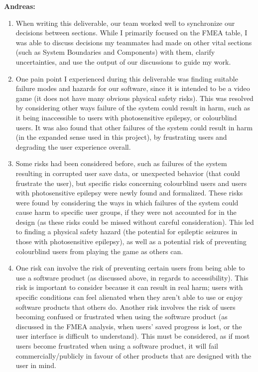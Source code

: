 \documentclass{article}
\begin{document}
\textbf{Andreas:}

\begin{enumerate}
	\item When writing this deliverable, our team worked well to synchronize 
	our decisions between sections. While I primarily focused on the FMEA 
	table, I was able to discuss decisions my teammates had made on other vital 
	sections (such as System Boundaries and Components) with them, clarify 
	uncertainties, and use the output of our discussions to guide my work.
	\item One pain point I experienced during this deliverable was finding 
	suitable failure modes and hazards for our software, since it is intended 
	to be a video game (it does not have many obvious physical safety risks). 
	This was resolved by considering other ways failure of the system could 
	result in harm, such as it being inaccessible to users with photosensitive 
	epilepsy, or colourblind users. It was also found that other failures of 
	the system could result in harm (in the expanded sense used in this 
	project), by frustrating users and degrading the user experience overall.
	\item Some risks had been considered before, such as failures of the system 
	resulting in corrupted user save data, or unexpected behavior (that could 
	frustrate the user), but specific risks concerning colourblind users and 
	users with photosensitive epilepsy were newly found and formalized. These 
	risks were found by considering the ways in which failures of the system 
	could cause harm to specific user groups, if they were not accounted for in 
	the design (as these risks could be missed without careful consideration). 
	This led to finding a physical safety hazard (the potential for epileptic 
	seizures in those with photosensitive epilepsy), as well as a potential 
	risk of preventing colourblind users from playing the game as others can.
	\item One risk can involve the risk of preventing certain users from being 
	able to use a software product (as discussed above, in regards to 
	accessibility). This risk is important to consider because it can result in 
	real harm; users with specific conditions can feel alienated when they 
	aren't able to use or enjoy software products that others do. Another risk 
	involves the risk of users becoming confused or frustrated when using the 
	software product (as discussed in the FMEA analysis, when users' saved 
	progress is lost, or the user interface is difficult to understand). This 
	must be considered, as if most users become frustrated when using a 
	software product, it will fail commercially/publicly in favour of other 
	products that are designed with the user in mind.
\end{enumerate}
\end{document}
